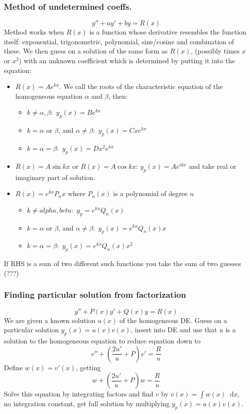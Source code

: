\documentclass[a4paper, 10pt]{article}
\newcommand*\diff{\mathop{}\!\mathrm{d}}
\begin{document}
\begin{multicols*}{3}
\subsubsection*{\small Method of undetermined coeffs.}
$$ y'' + ay' + by = R(x)$$
Method works when $R(x)$ is a function whose derivative resembles the function itself: exponential, trigonometric, polynomial, sine/cosine and combination of these. We then guess on a solution of the same form as $R(x)$, (possibly times $x$ or $x^2$) with an unknown coefficient which is determined by putting it into the equation:
\begin{itemize}
  \item $R(x) = Ae^{kx}$. We call the roots of the characteristic equation of the homogeneous equation $\alpha$ and $\beta$, then:
    \begin{itemize}
      \item $k\neq \alpha, \beta:$ $y_p(x) = Be^{kx}$
      \item $k=\alpha \text{ or } \beta$, and $\alpha\neq\beta:$ $y_p(x) = Cxe^{kx}$
      \item $k=\alpha=\beta:$ $y_p(x) = Dx^2e^{kx}$
    \end{itemize}
  \item $R(x) = A\sin{kx}$ or $R(x) = A\cos{kx}$: $y_p(x) = Ae^{ikx}$ and take real or imaginary part of solution.
  \item $R(x) = e^{kx} P_n{x}$ where $P_n(x)$ is a polynomial of degree $n$
  \begin{itemize}
    \item $k\neq alpha, beta:$ $y_p = e^{kx}Q_n(x)$
    \item $k=\alpha \text{ or } \beta$, and $\alpha\neq\beta:$ $y_p(x) = e^{kx}Q_n(x)x$
    \item $k=\alpha=\beta:$ $y_p(x) = e^{kx}Q_{n}(x)x^2$
  \end{itemize}
\end{itemize}
If RHS is a sum of two different such functions you take the sum of two guesses (???)

\subsubsection*{\small Finding particular solution from factorization}
$$y'' + P(x)y' + Q(x)y = R(x)$$
We are given a known solution $u(x)$ of the homogeneous DE. Guess on a particular solution $y_p(x) = u(x)v(x)$, insert into DE and use that $u$ is a solution to the homogeneous equation to reduce equation down to
$$ v'' + \left(\frac{2u'}{u}+P\right)v' = \frac{R}{u}$$
Define $w(x)=v'(x)$, getting
$$ w + \left(\frac{2u'}{u}+P\right)w = \frac{R}{u}$$
Solve this equation by integrating factors and find $v$ by $v(x) = \int w(x) \diff x$, no integration constant, get full solution by multiplying $y_p(x) = u(x)v(x)$.


\end{multicols*}
\end{document}
